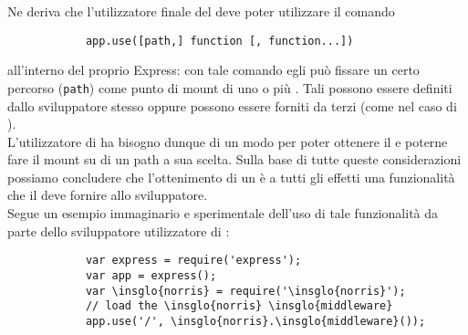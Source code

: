 		Ne deriva che l'utilizzatore finale del  deve poter utilizzare il comando
		\begin{lstlisting}
			app.use([path,] function [, function...])
		\end{lstlisting}
		all'interno del proprio  Express: con tale comando egli può fissare un certo percorso (\texttt{path}) come punto di mount di uno o più . Tali  possono essere definiti dallo sviluppatore stesso oppure possono essere forniti da terzi (come nel caso di ).\\
		L'utilizzatore di  ha bisogno dunque di un modo per poter ottenere il   e poterne fare il mount su di un path a sua scelta. Sulla base di tutte queste considerazioni possiamo concludere che l'ottenimento di un  è a tutti gli effetti una funzionalità che il   deve fornire allo sviluppatore.\\
		Segue un esempio immaginario e sperimentale dell'uso di tale funzionalità da parte dello sviluppatore utilizzatore di :
		\begin{lstlisting}
			var express = require('express');
			var app = express();
			var \insglo{norris} = require('\insglo{norris}');
			// load the \insglo{norris} \insglo{middleware}
			app.use('/', \insglo{norris}.\insglo{middleware}());
		\end{lstlisting}

